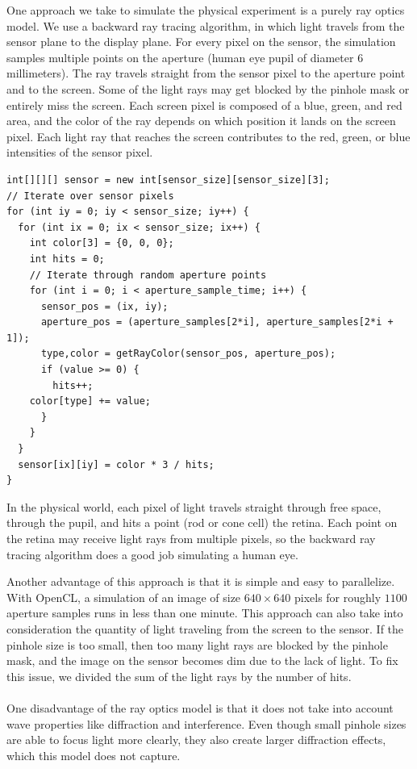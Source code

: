 \documentclass{acmsiggraph}
\begin{document}
One approach we take to simulate the physical experiment is a purely ray optics model. We use a backward ray tracing algorithm, in which light travels from the sensor plane to the display plane. For every pixel on the sensor, the simulation samples multiple points on the aperture (human eye pupil of diameter 6 millimeters). The ray travels straight from the sensor pixel to the aperture point and to the screen. Some of the light rays may get blocked by the pinhole mask or entirely miss the screen. Each screen pixel is composed of a blue, green, and red area, and the color of the ray depends on which position it lands on the screen pixel. Each light ray that reaches the screen contributes to the red, green, or blue intensities of the sensor pixel.

\begin{lstlisting}[frame=single, caption=Pseudocode For Ray Optics Simulation]
int[][][] sensor = new int[sensor_size][sensor_size][3];
// Iterate over sensor pixels
for (int iy = 0; iy < sensor_size; iy++) {
  for (int ix = 0; ix < sensor_size; ix++) {
    int color[3] = {0, 0, 0};
    int hits = 0;
    // Iterate through random aperture points
    for (int i = 0; i < aperture_sample_time; i++) {
      sensor_pos = (ix, iy);
      aperture_pos = (aperture_samples[2*i], aperture_samples[2*i + 1]);
      type,color = getRayColor(sensor_pos, aperture_pos);
      if (value >= 0) {
        hits++;
	color[type] += value;
      }
    }
  }
  sensor[ix][iy] = color * 3 / hits;
}
\end{lstlisting}

In the physical world, each pixel of light travels straight through free space, through the pupil, and hits a point (rod or cone cell) the retina. Each point on the retina may receive light rays from multiple pixels, so the backward ray tracing algorithm does a good job simulating a human eye. 

Another advantage of this approach is that it is simple and easy to parallelize. With OpenCL, a simulation of an image of size $640\times640$ pixels for roughly $1100$ aperture samples runs in less than one minute. This approach can also take into consideration the quantity of light traveling from the screen to the sensor. If the pinhole size is too small, then too many light rays are blocked by the pinhole mask, and the image on the sensor becomes dim due to the lack of light. To fix this issue, we divided the sum of the light rays by the number of hits. \\
\\
One disadvantage of the ray optics model is that it does not take into account wave properties like diffraction and interference. Even though small pinhole sizes are able to focus light more clearly, they also create larger diffraction effects, which this model does not capture. 
\end{document}
